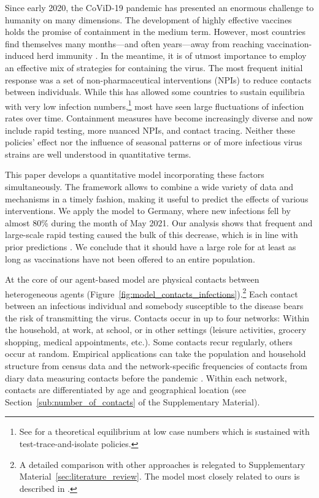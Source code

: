 Since early 2020, the CoViD-19 pandemic has
presented an enormous challenge to humanity on many dimensions. The development of highly
effective vaccines holds the promise of containment in the medium term. However, most
countries find themselves many months---and often years---away from reaching
vaccination-induced herd immunity \citep{Swaminathan2021}. In the meantime, it is of utmost
importance to employ an effective mix of strategies for containing the virus. The most
frequent initial response was a set of non-pharmaceutical interventions (NPIs) to reduce
contacts between individuals. While this has allowed some countries to sustain equilibria
with very low infection numbers,\footnote{See \citet{Contreras2021} for a theoretical
equilibrium at low case numbers which is sustained with test-trace-and-isolate policies.}
most have seen large fluctuations of infection rates over time. Containment measures have
become increasingly diverse and now include rapid testing, more nuanced NPIs, and contact
tracing. Neither these policies' effect nor the influence of seasonal patterns or of more
infectious virus strains are well understood in quantitative terms.

This paper develops a quantitative model incorporating these factors simultaneously. The
framework allows to combine a wide variety of data and mechanisms in a timely fashion,
making it useful to predict the effects of various interventions. We apply the model to
Germany, where new infections fell by almost 80\% during the month of May 2021. Our
analysis shows that frequent and large-scale rapid testing caused the bulk of this
decrease, which is in line with prior predictions \citep{Mina2021}. We conclude that it
should have a large role for at least as long as vaccinations have not been offered to
an entire population.

At the core of our agent-based model are physical contacts between heterogeneous agents
(Figure~\ref{fig:model_contacts_infections}).\footnote{A detailed comparison with other
approaches  is relegated to Supplementary Material~\ref{sec:literature_review}. The
model most closely related to ours is described in \citet{Hinch2020}.} Each contact
between an infectious individual and somebody susceptible to the disease bears the risk
of transmitting the virus. Contacts occur in up to four networks: Within the household,
at work, at school, or in other settings (leisure activities, grocery shopping, medical
appointments, etc.). Some contacts recur regularly, others occur at random. Empirical
applications can take the population and household structure from census data and the
network-specific frequencies of contacts from diary data measuring contacts before the
pandemic \citep[e.g.][]{Mossong2008,Hoang2019}. Within each network, contacts are
differentiated by age and geographical location (see
Section~\ref{sub:number_of_contacts} of the Supplementary Material).

